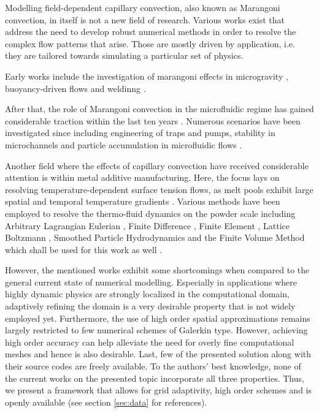 \documentclass[conference,final]{IEEEtran}
\begin{document}
Modelling field-dependent capillary convection, also known as Marangoni convection, in itself is not a new field of research.
Various works exist that address the need to develop robust numerical methods in order to resolve the complex flow patterns that arise. Those are mostly driven by application, i.e. they are tailored towards simulating a particular set of physics.

Early works include the investigation of marangoni effects in microgravity \cite{chunExperimentsTransitionSteady1979,chunMicrogravitySimulationMarangoni1978}, buoyancy-driven flows \cite{villersCoupledBuoyancyMarangoni1992} and weldinng \cite{limmaneevichitrExperimentsSimulateEffect2000,limmaneevichitrVisualizationMarangoniConvection2000}.

After that, the role of Marangoni convection in the microfluidic regime has gained considerable traction within the last ten years \cite{karbalaeiThermocapillarityMicrofluidicsReview2016}. Numerous scenarios have been investigated since including engineering of traps and pumps, stability in microchannels and particle accumulation in microfluidic flows \cite{panInstabilityMarangoniToroidal2011,basuVirtualMicrofluidicTraps2008,orlishausenParticleAccumulationDepletion2017}.

Another field where the effects of capillary convection have received considerable attention is within metal additive manufacturing. Here, the focus lays on resolving temperature-dependent surface tension flows, as melt pools exhibit large spatial and temporal temperature gradients \cite{debroyAdditiveManufacturingMetallic2018}. Various methods have been employed to resolve the thermo-fluid dynamics on the powder scale including Arbitrary Lagrangian Eulerian \cite{khairallahMesoscopicSimulationModel2014,martinDynamicsPoreFormation2019}, Finite Difference \cite{gusarovModelRadiationHeat2009}, Finite Element \cite{zhangMultiscaleMultiphysicsModeling2018,caoNovelHighefficientFinite2021}, Lattice Boltzmann \cite{krzyzanowskiMultiphysicsSimulationApproach2021}, Smoothed Particle Hydrodynamics \cite{wimmerExperimentalNumericalInvestigations2021} and the Finite Volume Method which shall be used for this work as well \cite{leeMesoscopicSimulationHeat2015,gurtlerSimulationLaserBeam2013,ottoMultiphysicalSimulationLaser2012}.

However, the mentioned works exhibit some shortcomings when compared to the general current state of numerical modelling. Especially in applications where highly dynamic physics are strongly localized in the computational domain, adaptively refining the domain is a very desirable property that is not widely employed yet. Furthermore, the use of high order spatial approximations remains largely restricted to few numerical schemes of Galerkin type. However, achieving high order accuracy can help alleviate the need for overly fine computational meshes and hence is also desirable. Last, few of the presented solution along with their source codes are freely available. To the authors' best knowledge, none of the current works on the presented topic incorporate all three properties. Thus, we present a framework that allows for grid adaptivity, high order schemes and is openly available (see section \ref{sec:data} for references).
\end{document}
